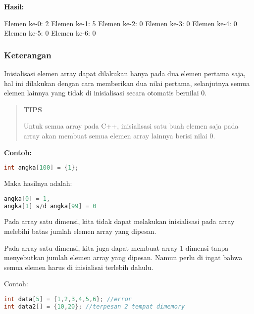 

\textbf{Hasil:}

\begin{lcverbatim}
Elemen ke-0: 2
Elemen ke-1: 5
Elemen ke-2: 0
Elemen ke-3: 0
Elemen ke-4: 0
Elemen ke-5: 0
Elemen ke-6: 0
\end{lcverbatim}

\subsubsection*{Keterangan}

Inisialisasi elemen array dapat dilakukan hanya pada dua elemen pertama
saja, hal ini dilakukan dengan cara memberikan dua nilai pertama,
selanjutnya semua elemen lainnya yang tidak di inisialisasi secara
otomatis bernilai 0.

\begin{quotation}
{\LARGE {}} \textbf{TIPS}

Untuk
semua array pada C++, inisialisasi satu buah elemen saja pada array akan
membuat semua elemen array lainnya berisi nilai 0.
\end{quotation}
 

\textbf{Contoh:}

\begin{lstlisting}[language=c++, numbers=none]
int angka[100] = {1};
\end{lstlisting}

Maka hasilnya adalah:

\begin{lstlisting}[language=c++, numbers=none]
angka[0] = 1,
angka[1] s/d angka[99] = 0
\end{lstlisting}

Pada array satu dimensi, kita tidak dapat melakukan inisialisasi pada
array melebihi batas jumlah elemen array yang dipesan.

Pada array satu dimensi, kita juga dapat membuat array 1 dimensi tanpa
menyebutkan jumlah elemen array yang dipesan. Namun perlu di ingat bahwa
semua elemen harus di inisialisai terlebih dahulu.

Contoh:

\begin{lstlisting}[language=c++, numbers=none]
int data[5] = {1,2,3,4,5,6}; //error
int data2[] = {10,20}; //terpesan 2 tempat dimemory
\end{lstlisting}

